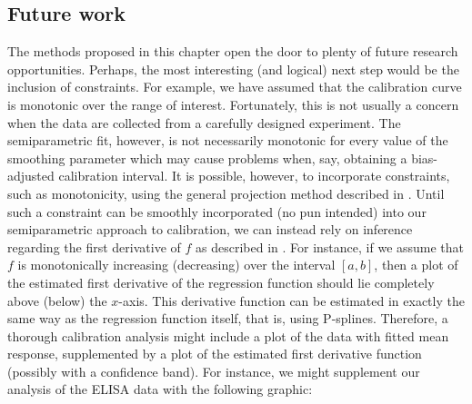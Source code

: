 \documentclass[cmfont,usenames,dvipsnames,leqno]{afit-etd}\usepackage[]{graphicx}\usepackage[]{color}
\begin{document}
\subsection{Future work}
The methods proposed in this chapter open the door to plenty of future research opportunities. Perhaps, the most interesting (and logical) next step would be the inclusion of constraints. For example, we have assumed that the calibration curve is monotonic over the range of interest. Fortunately, this is not usually a concern when the data are collected from a carefully designed experiment. The semiparametric fit, however, is not necessarily monotonic for every value of the smoothing parameter which may cause problems when, say, obtaining a bias-adjusted calibration interval. It is possible, however, to incorporate constraints, such as monotonicity, using the general projection method described in \citet{mammen_general_2001}. Until such a constraint can be smoothly incorporated (no pun intended) into our semiparametric approach to calibration, we can instead rely on inference regarding the first derivative of $f$ as described in \citet[pp. 151-156]{ruppert_semiparametric_2003}. For instance, if we assume that $f$ is monotonically increasing (decreasing) over the interval $[a, b]$, then a plot of the estimated first derivative of the regression function should lie completely above (below) the $x$-axis. This derivative function can be estimated in exactly the same way as the regression function itself, that is, using \ac{P-spline}s. Therefore, a thorough calibration analysis might include a plot of the data with fitted mean response, supplemented by a plot of the estimated first derivative function (possibly with a confidence band). For instance, we might supplement our analysis of the ELISA data with the following graphic:
\end{document}
